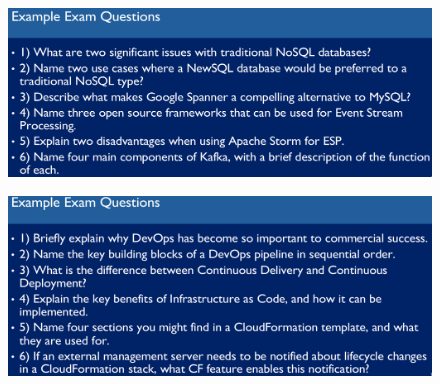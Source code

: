 \documentclass[a4paper]{article}
\begin{document}
\begin{multicols}{3}
\begin{figure}[H]
    \includegraphics[width=\linewidth]{ExampleExamQuestions05.png}
    \label{fig:examquestion05}
\end{figure}

\begin{figure}[H]
    \includegraphics[width=\linewidth]{ExampleExamQuestions06.png}
    \label{fig:examquestion06}
\end{figure}

\vspace*{\fill}
    \pagebreak
\end{multicols}
\end{document}
